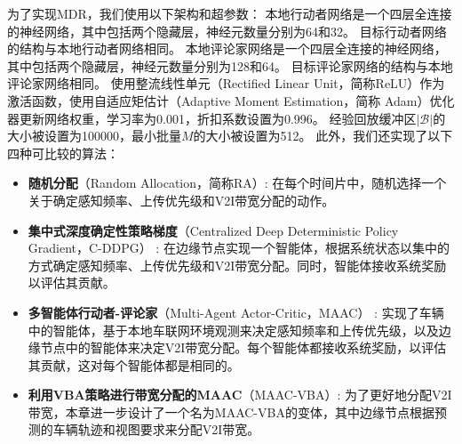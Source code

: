 为了实现MDR，我们使用以下架构和超参数：
本地行动者网络是一个四层全连接的神经网络，其中包括两个隐藏层，神经元数量分别为64和32。
目标行动者网络的结构与本地行动者网络相同。
本地评论家网络是一个四层全连接的神经网络，其中包括两个隐藏层，神经元数量分别为128和64。
目标评论家网络的结构与本地评论家网络相同。
使用整流线性单元（Rectified Linear Unit，简称ReLU）作为激活函数，使用自适应矩估计（Adaptive Moment Estimation，简称 Adam）优化器更新网络权重，学习率为0.001，折扣系数设置为0.996。
经验回放缓冲区$|\mathcal{B}|$的大小被设置为100000，最小批量$M$的大小被设置为512。
此外，我们还实现了以下四种可比较的算法：

\begin{itemize}
	\item \textbf{随机分配}（Random Allocation，简称RA）: 在每个时间片中，随机选择一个关于确定感知频率、上传优先级和V2I带宽分配的动作。
	\item \textbf{集中式深度确定性策略梯度}（Centralized Deep Deterministic Policy Gradient，C-DDPG） \cite{mlika2022deep}: 在边缘节点实现一个智能体，根据系统状态以集中的方式确定感知频率、上传优先级和V2I带宽分配。同时，智能体接收系统奖励以评估其贡献。
	\item \textbf{多智能体行动者-评论家}（Multi-Agent Actor-Critic，MAAC） \cite{he2021efficient}: 实现了车辆中的智能体，基于本地车联网环境观测来决定感知频率和上传优先级，以及边缘节点中的智能体来决定V2I带宽分配。每个智能体都接收系统奖励，以评估其贡献，这对每个智能体都是相同的。
	\item \textbf{利用VBA策略进行带宽分配的MAAC}（MAAC-VBA）: 为了更好地分配V2I带宽，本章进一步设计了一个名为MAAC-VBA的变体，其中边缘节点根据预测的车辆轨迹和视图要求来分配V2I带宽。
\end{itemize}

